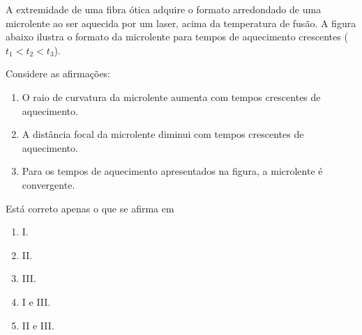 \documentclass[oneside,a4paper]{amsart}
\begin{document}
\begin{questao}
  A extremidade de uma fibra ótica adquire o formato arredondado de uma
  microlente ao ser aquecida por um laser, acima da temperatura de
  fusão. A figura abaixo ilustra o formato da microlente para tempos de
  aquecimento crescentes ($t_1<t_2<t_3$).

  Considere as afirmações:

  \begin{enumerate}[\bf I.]
    \item O raio de curvatura da microlente aumenta com
    tempos crescentes de aquecimento.
    \item A distância focal da microlente diminui com tempos
    crescentes de aquecimento.
    \item Para os tempos de aquecimento apresentados na
    figura, a microlente é convergente.
  \end{enumerate}

  Está correto apenas o que se afirma em

  \begin{enumerate}[\bf a.]
    \item I.
    \item II.
    \item III.
    \item I e III.
    \item II e III. %
  \end{enumerate}
\end{questao}
\end{document}
